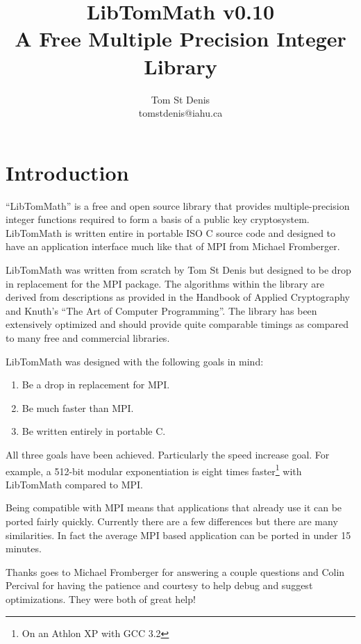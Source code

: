 \documentclass{article}
\begin{document}
\title{LibTomMath v0.10 \\ A Free Multiple Precision Integer Library}
\author{Tom St Denis \\ tomstdenis@iahu.ca}
\maketitle
\newpage

\section{Introduction}
``LibTomMath'' is a free and open source library that provides multiple-precision integer functions required to form a basis
of a public key cryptosystem.  LibTomMath is written entire in portable ISO C source code and designed to have an application
interface much like that of MPI from Michael Fromberger.  

LibTomMath was written from scratch by Tom St Denis but designed to be  drop in replacement for the MPI package.  The 
algorithms within the library are derived from descriptions as provided in the Handbook of Applied Cryptography and Knuth's
``The Art of Computer Programming''.  The library has been extensively optimized and should provide quite comparable 
timings as compared to many free and commercial libraries.

LibTomMath was designed with the following goals in mind:
\begin{enumerate}
\item Be a drop in replacement for MPI.
\item Be much faster than MPI.
\item Be written entirely in portable C.
\end{enumerate}

All three goals have been achieved.  Particularly the speed increase goal.  For example, a 512-bit modular exponentiation 
is eight times faster\footnote{On an Athlon XP with GCC 3.2} with LibTomMath compared to MPI.

Being compatible with MPI means that applications that already use it can be ported fairly quickly.  Currently there are 
a few differences but there are many similarities.  In fact the average MPI based application can be ported in under 15
minutes.  

Thanks goes to Michael Fromberger for answering a couple questions and Colin Percival for having the patience and courtesy to
help debug and suggest optimizations.  They were both of great help!
\end{document}
